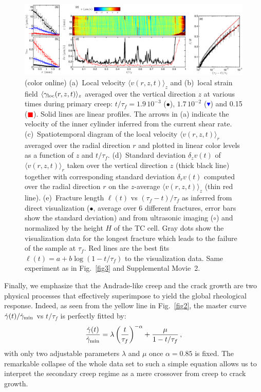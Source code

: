 \documentclass[twocolumn,superscriptaddress,showpacs,preprintnumbers,amsmath,amssymb,prl]{revtex4}
\newcommand\gp{\dot\gamma}
\newcommand\gl{\gamma_{\rm loc}}
\begin{document}
\begin{figure}
\centering
\includegraphics[width=17.5cm,clip]{Fig4.eps}
\caption{(color online) (a)~Local velocity $\langle v(r,z,t)\rangle_z$ and (b)~local strain field $\langle\gl(r,z,t)\rangle_z$ averaged over the vertical direction $z$ at various times during primary creep: $t/\tau_f=1.9\,10^{-3}$ ($\bullet$), $1.7\,10^{-2}$ (\textcolor{blue}{$\blacktriangledown$}) and 0.15 (\textcolor{red}{$\blacksquare$}). Solid lines are linear profiles. The arrows in (a) indicate the velocity of the inner cylinder inferred from the current shear rate. (c)~Spatiotemporal diagram of the local velocity $\langle v(r,z,t)\rangle_r$ averaged over the radial direction $r$ and plotted in linear color levels as a function of $z$ and $t/\tau_f$. (d)~Standard deviation $\delta_z v(t)$ of $\langle v(r,z,t)\rangle_r$ taken over the vertical direction $z$ (thick black line) together with corresponding standard deviation $\delta_r v(t)$ computed over the radial direction $r$ on the $z$-average $\langle v(r,z,t)\rangle_z$ (thin red line). (e)~Fracture length $\ell(t)$ vs $(\tau_f-t)/\tau_f$ as inferred from direct visualization ($\bullet$, average over 6 different fractures, error bars show the standard deviation) and from ultrasonic imaging ($\circ$) and normalized by the height $H$ of the TC cell. Gray dots show the visualization data for the longest fracture which leads to the failure of the sample at $\tau_f$. Red lines are the best fits $\ell(t)=a+b\log(1-t/\tau_f)$ to the visualization data. Same experiment as in Fig.~\ref{fig3} and Supplemental Movie~2.
\label{fig4}}
\end{figure} 

Finally, we emphasize that the Andrade-like creep and the crack growth are two physical processes that effectively superimpose to yield the global rheological response. Indeed, as seen from the yellow line in Fig.~\ref{fig2}, the master curve $\gp(t)/\gp_{\rm min}$ vs $t/\tau_f$ is perfectly fitted by:
\begin{equation}
\frac{\gp(t)}{\gp_{\rm min}}=\lambda \left(\frac{t}{\tau_f}\right)^{-\alpha}+ \frac{\mu}{1-t/\tau_f}\,,
\label{e.fit}
\end{equation}
with only two adjustable parameters $\lambda$ and $\mu$ once $\alpha=0.85$ is fixed. The remarkable collapse of the whole data set to such a simple equation allows us to interpret the secondary creep regime as a mere crossover from creep to crack growth.
\end{document}
